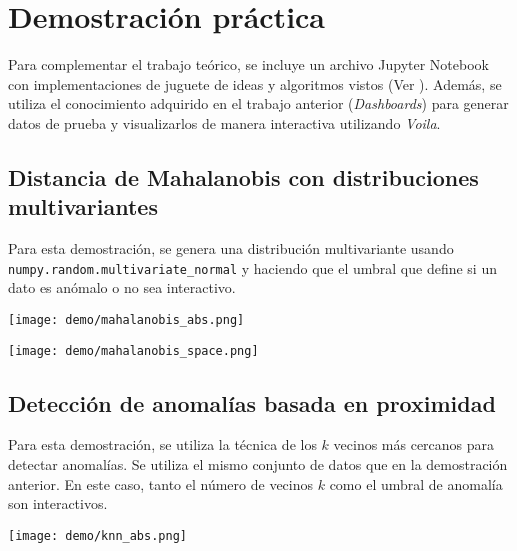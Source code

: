 \chapter{Demostración práctica}
Para complementar el trabajo teórico, se incluye un archivo Jupyter Notebook con
implementaciones de juguete de ideas y algoritmos vistos (Ver ).
Además, se utiliza el conocimiento adquirido en el trabajo anterior (\textit{Dashboards})
para generar datos de prueba y visualizarlos de manera interactiva utilizando \textit{Voila}.

\section{Distancia de Mahalanobis con distribuciones multivariantes}
Para esta demostración, se genera una distribución multivariante usando \\
\Verb#numpy.random.multivariate_normal# y haciendo que el umbral que define si un dato
es anómalo o no sea interactivo.

\noindent
\begin{minipage}{\linewidth}
	\centering
	\texttt{[image: demo/mahalanobis\_abs.png]}
	\label{fig:demo11}
\end{minipage}

\noindent
\begin{minipage}{\linewidth}
	\centering
	\texttt{[image: demo/mahalanobis\_space.png]}
	\label{fig:demo12}
\end{minipage}
\newpage{}
\section{Detección de anomalías basada en proximidad}
Para esta demostración, se utiliza la técnica de los $k$ vecinos más cercanos para detectar
anomalías. Se utiliza el mismo conjunto de datos que en la demostración anterior. En este caso,
tanto el número de vecinos $k$ como el umbral de anomalía son interactivos.

\noindent
\begin{minipage}{\linewidth}
	\centering
	\texttt{[image: demo/knn\_abs.png]}
	\label{fig:demo21}
\end{minipage}

